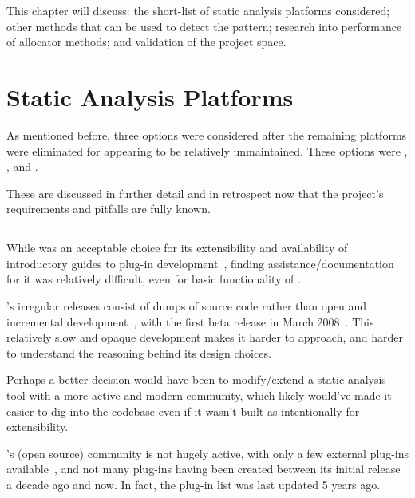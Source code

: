 This chapter will discuss: the short-list of static analysis platforms considered; other methods that can be used to detect the pattern; research into performance of allocator methods; and validation of the project space.

\section{Static Analysis Platforms}

As mentioned before, three options were considered after the remaining platforms were eliminated for appearing to be relatively unmaintained. These options were , , and .

These are discussed in further detail and in retrospect now that the project's requirements and pitfalls are fully known.

\subsection{}

While  was an acceptable choice for its extensibility and availability of introductory guides to plug-in development~\cite{framaplug}, finding assistance/documentation for it was relatively difficult, even for basic functionality of .

's irregular releases consist of dumps of source code rather than open and incremental development~\cite{framagit}, with the first beta release in March 2008~\cite{framahydrogen}. This relatively slow and opaque development makes it harder to approach, and harder to understand the reasoning behind its design choices.

Perhaps a better decision would have been to modify/extend a static analysis tool with a more active and modern community, which likely would've made it easier to dig into the codebase even if it wasn't built as intentionally for extensibility.

's (open source) community is not hugely active, with only a few external plug-ins available~\cite{framapluglist}, and not many plug-ins having been created between its initial release a decade ago and now. In fact, the plug-in list was last updated 5 years ago.

\subsection{}

